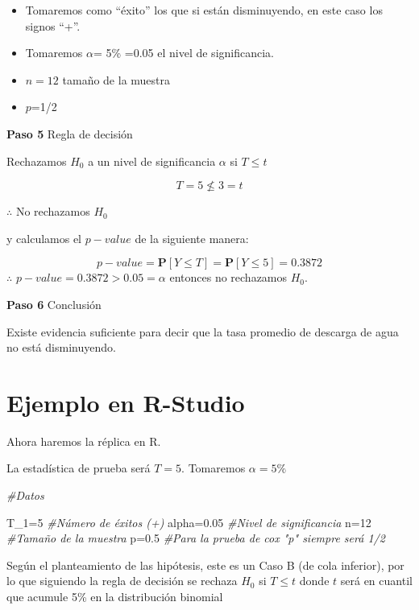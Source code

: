 \documentclass[
  a4paper,
  oneside,
  openany]{book}
\newenvironment{Shaded}{\begin{snugshade}}{\end{snugshade}}
\newcommand{\CommentTok}[1]{\textcolor[rgb]{0.56,0.35,0.01}{\textit{#1}}}
\newcommand{\DecValTok}[1]{\textcolor[rgb]{0.00,0.00,0.81}{#1}}
\newcommand{\FloatTok}[1]{\textcolor[rgb]{0.00,0.00,0.81}{#1}}
\newcommand{\NormalTok}[1]{#1}
\newcommand{\OtherTok}[1]{\textcolor[rgb]{0.56,0.35,0.01}{#1}}
\begin{document}
\begin{itemize}
\item
  Tomaremos como ``éxito'' los que si están disminuyendo, en este caso los signos ``+''.
\item
  Tomaremos \(\alpha\)= 5\% =0.05 el nivel de significancia.
\item
  \(n=12\) tamaño de la muestra
\item
  \(p\)=1/2
\end{itemize}

\textbf{Paso 5} Regla de decisión

Rechazamos \(H_0\) a un nivel de significancia \(\alpha\) si \(T \leq t\)

\[T=5 \nleq 3=t\]

\(\therefore\) No rechazamos \(H_0\)

y calculamos el \(p-value\) de la siguiente manera:

\[p-value=\mathbf{P}[Y\leq T]=\mathbf{P}[Y\leq 5]=0.3872\]
\(\therefore\) \(p-value=0.3872>0.05=\alpha\) entonces no rechazamos \(H_0\).

\textbf{Paso 6} Conclusión

Existe evidencia suficiente para decir que la tasa promedio de descarga de agua no está disminuyendo.

\hypertarget{ejemplo-en-r-studio-4}{%
\section{Ejemplo en R-Studio}\label{ejemplo-en-r-studio-4}}

Ahora haremos la réplica en R.

La estadística de prueba será \(T=5\). Tomaremos \(\alpha=5\%\)

\begin{Shaded}
\begin{Highlighting}[]
\CommentTok{\#Datos}

\NormalTok{T\_1}\OtherTok{=}\DecValTok{5}              \CommentTok{\#Número de éxitos (+)}
\NormalTok{alpha}\OtherTok{=}\FloatTok{0.05}       \CommentTok{\#Nivel de significancia}
\NormalTok{n}\OtherTok{=}\DecValTok{12}              \CommentTok{\#Tamaño de la muestra }
\NormalTok{p}\OtherTok{=}\FloatTok{0.5}            \CommentTok{\#Para la prueba de cox "p" siempre será 1/2}
\end{Highlighting}
\end{Shaded}

Según el planteamiento de las hipótesis, este es un Caso B (de cola inferior), por lo que siguiendo la regla de decisión se rechaza \(H_0\) si \(T\leq t\) donde \(t\) será en cuantil que acumule 5\% en la distribución binomial
\end{document}
